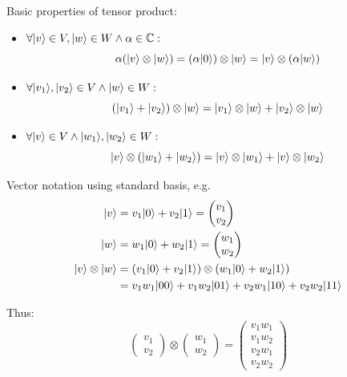 Basic properties of tensor product:
\begin{itemize}
    \item $\forall \lvert v\rangle \in V, \lvert w\rangle \in W \land \alpha \in \mathbb{C}:$
    \begin{equation}
        \alpha (\lvert v\rangle \otimes \lvert w\rangle) 
            = (\alpha \lvert0\rangle) \otimes \lvert w\rangle 
            = \lvert v\rangle \otimes (\alpha \lvert w\rangle)
    \end{equation}

    \item $\forall \lvert v_1\rangle, \lvert v_2\rangle \in V \land \lvert w\rangle \in W:$
    \begin{equation}
        (\lvert v_1\rangle + \lvert v_2\rangle) \otimes \lvert w\rangle 
            = \lvert v_1\rangle \otimes \lvert w\rangle + \lvert v_2\rangle \otimes \lvert w\rangle
    \end{equation}

    \item $\forall \lvert v\rangle \in V \land \lvert w_1\rangle, \lvert w_2\rangle \in W:$
    \begin{equation}
        \lvert v\rangle \otimes (\lvert w_1\rangle + \lvert w_2\rangle)
            = \lvert v\rangle \otimes \lvert w_1\rangle + \lvert v\rangle \otimes \lvert w_2\rangle
    \end{equation}
\end{itemize}

Vector notation using standard basis, e.g.
\begin{align*}
    \ket{v} &= v_1\ket{0} + v_2\ket{1} = \begin{pmatrix*}
        v_1 \\ v_2
    \end{pmatrix*} \\
    \ket{w} &= w_1\ket{0} + w_2\ket{1} = \begin{pmatrix*}
        w_1 \\ w_2
    \end{pmatrix*} \\
    \ket{v} \otimes \ket{w} &= (v_1\ket{0} + v_2\ket{1}) \otimes (w_1\ket{0} + w_2\ket{1}) \\
    &= v_1 w_1 \ket{00} + v_1 w_2 \ket{01} + v_2 w_1 \ket{10} + v_2 w_2 \ket{11}
\end{align*}

Thus: 
\begin{equation*}
    \begin{pmatrix*}
        v_1 \\ v_2
    \end{pmatrix*} \otimes
    \begin{pmatrix*}
        w_1 \\ w_2
    \end{pmatrix*} = 
    \begin{pmatrix*}
        v_1 w_1 \\ v_1 w_2 \\ v_2 w_1 \\ v_2 w_2
    \end{pmatrix*}
\end{equation*}


